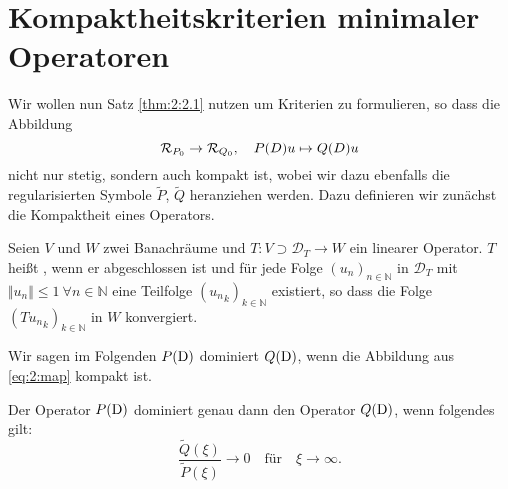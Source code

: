 \section{Kompaktheitskriterien minimaler Operatoren}
Wir wollen nun Satz \ref{thm:2:2.1} nutzen um Kriterien zu formulieren, so dass die Abbildung
\begin{equation}\label{eq:2:map}
\mathcal R_{P_0}\to\mathcal R_{Q_0},\quad P(D)u\mapsto Q(D)u
\end{equation}
nicht nur stetig, sondern auch kompakt ist, wobei wir dazu ebenfalls die regularisierten Symbole $\widetilde{P}$, $\widetilde{Q}$ heranziehen werden. Dazu definieren wir zunächst die Kompaktheit eines Operators.
\begin{df}
Seien $V$ und $W$ zwei Banachräume und $T: V \supset \mathcal{D}_T \rightarrow W$ ein linearer Operator. $T$ heißt , wenn er abgeschlossen ist und für jede Folge $(u_n)_{n \in \mathbb{N}}$ in $\mathcal{D}_T$ mit $\Vert u_n \Vert \leq 1 \ \forall n \in \mathbb{N}$ eine Teilfolge $({u_n}_k)_{k \in \mathbb{N}}$ existiert, so dass die Folge $({Tu_n}_k)_{k\in \mathbb{N}}$ in $W$ konvergiert.
\end{df}
Wir sagen im Folgenden $P(\mathrm D)$ dominiert $Q(\mathrm D)$, wenn die Abbildung aus \eqref{eq:2:map} kompakt ist.
\begin{thm}\label{Abbildung kompakt}
Der Operator $P(\mathrm D)$ dominiert genau dann den Operator $Q(\mathrm D)$,
wenn folgendes gilt:
\begin{equation}\label{eq:2:tozero}
\frac{\widetilde{Q}(\xi)}{\widetilde{P}(\xi)}\rightarrow0 \quad\text{für}\quad\xi\rightarrow\infty.
\end{equation}
\end{thm}
